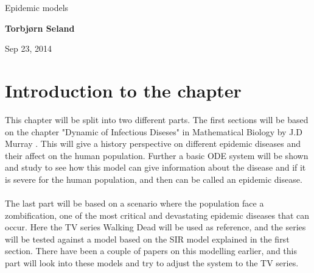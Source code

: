 \documentclass[%
twoside,                 %
final,                   %
10pt]{article}
\begin{document}






\thispagestyle{empty}

\begin{center}
{\LARGE\bf
\begin{spacing}{1.25}
Epidemic models
\end{spacing}
}
\end{center}


\begin{center}
{\bf Torbjørn Seland${}^{}$} \\ [0mm]
\end{center}

    \begin{center}
\end{center}


\begin{center}
Sep 23, 2014
\end{center}

\vspace{1cm}


\tableofcontents


\vspace{1cm} %




\section{Introduction to the chapter}
This chapter will be split into two different parts. The first sections will be based on the chapter "Dynamic of Infectious Diseses" in Mathematical Biology by J.D Murray \cite{murray2002mathematical}. This will give a history perspective on different epidemic diseases and their affect on the human population. Further a basic ODE system will be shown and study to see how this model can give information about the disease and if it is severe for the human population, and then can be called an epidemic disease.
\\
\\
The last part will be based on a scenario where the population face a zombification, one of the most critical and devastating epidemic diseases that can occur. Here the TV series Walking Dead will be used as reference, and the series will be tested against a model based on the SIR model explained in the first section. There have been a couple of papers on this modelling earlier, and this part will look into these models and try to adjust the system to the TV series.     
\end{document}
